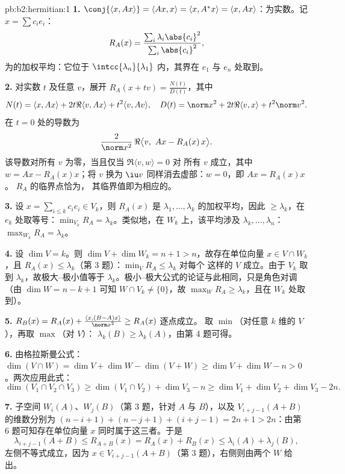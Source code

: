 \begin{solution}{pb:b2:hermitian:1}
\textbf{1.} $\conj{\langle x, Ax\rangle} = \langle Ax, x\rangle
= \langle x, A^*x\rangle = \langle x, Ax\rangle$：为实数。记
$x = \sum c_ie_i$：
\[
R_A(x) = \frac{\sum_i\lambda_i\abs{c_i}^2}
{\sum_i\abs{c_i}^2} ,
\]
为的加权平均：它位于
$\intcc{\lambda_n}{\lambda_1}$ 内，其界在
$e_1$ 与 $e_n$ 处取到。

\textbf{2.} 对实数 $t$ 及任意 $v$，展开 $R_A(x + tv) =
\frac{N(t)}{D(t)}$，其中
\[
N(t) = \langle x, Ax\rangle + 2t\Re\langle v, Ax\rangle +
t^2\langle v, Av\rangle,
\quad
D(t) = \norm x^2 + 2t\Re\langle v, x\rangle + t^2\norm v^2 .
\]
在 $t = 0$ 处的导数为
\[
\frac{2}{\norm x^2}\,
\Re\bigl\langle v,\ Ax - R_A(x)\,x\bigr\rangle .
\]
该导数对所有 $v$ 为零，当且仅当 $\Re\langle v, w\rangle = 0$ 对
所有 $v$ 成立，其中 $w = Ax - R_A(x)x$；将 $v$ 换为 $\iu v$
同样消去虚部：$w = 0$，即 $Ax = R_A(x)x$。
$R_A$ 的临界点恰为，
其临界值即为相应的。

\textbf{3.} 设 $x = \sum_{i\leq k}c_ie_i \in V_k$，则 $R_A(x)$ 是
$\lambda_1, \dots, \lambda_k$ 的加权平均，因此
$\geq \lambda_k$，在 $e_k$ 处取等号：$\min_{V_k} R_A =
\lambda_k$。类似地，在 $W_k$ 上，该平均涉及
$\lambda_k, \dots, \lambda_n$：$\max_{W_k}R_A = \lambda_k$。

\textbf{4.} 设 $\dim V = k$。则 $\dim V + \dim W_k = n + 1 >
n$，故存在单位向量 $x \in V \cap W_k$，且 $R_A(x) \leq
\lambda_k$（第 3 题）：$\min_{V}R_A \leq \lambda_k$ 对每个
这样的 $V$ 成立。由于 $V_k$ 取到 $\lambda_k$，故极大–极小值等于
$\lambda_k$。极小–极大公式的论证与此相同，只是角色对调
（由 $\dim W = n - k + 1$ 可知 $W \cap V_k \neq
\{0\}$，故 $\max_W R_A \geq \lambda_k$，且在 $W_k$ 处取到）。

\textbf{5.} $R_B(x) = R_A(x) + \frac{\langle x,
(B-A)x\rangle}{\norm x^2} \geq R_A(x)$ 逐点成立。
取 $\min$（对任意 $k$ 维的 $V$），再取 $\max$（对 $V$）：
$\lambda_k(B) \geq \lambda_k(A)$，由第 4 题可得。

\textbf{6.} 由格拉斯曼公式：$\dim(V\cap W) = \dim V + \dim W -
\dim(V + W) \geq \dim V + \dim W - n > 0$。两次应用此式：
\[
\dim(V_1\cap V_2\cap V_3)
\geq \dim(V_1\cap V_2) + \dim V_3 - n
\geq \dim V_1 + \dim V_2 + \dim V_3 - 2n .
\]

\textbf{7.} 子空间 $W_i(A)$、$W_j(B)$（第 3 题，针对
$A$ 与 $B$），以及 $V_{i+j-1}(A+B)$ 的维数分别为 $(n-i+1) +
(n-j+1) + (i+j-1) = 2n + 1 > 2n$：由第 6 题可知存在单位向量
$x$ 同时属于这三者。于是
\[
\lambda_{i+j-1}(A+B) \leq R_{A+B}(x)
= R_A(x) + R_B(x) \leq \lambda_i(A) + \lambda_j(B),
\]
左侧不等式成立，因为 $x \in V_{i+j-1}(A+B)$（第
3 题），右侧则由两个 $W$ 给出。


\end{solution}
